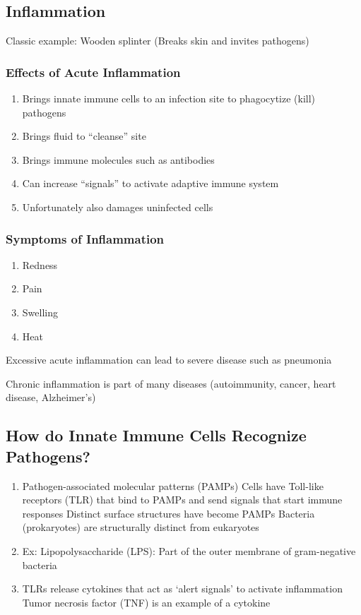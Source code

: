\documentclass{notes}
\begin{document}
\subsection{Inflammation}
Classic example: Wooden splinter (Breaks skin and invites pathogens)

\subsubsection*{Effects of Acute Inflammation}
\begin{enumerate}
    \item Brings innate immune cells to an infection site to phagocytize (kill) pathogens
    \item Brings fluid to ``cleanse'' site
    \item Brings immune molecules such as antibodies
    \item Can increase ``signals'' to activate adaptive immune system
    \item Unfortunately also damages uninfected cells
\end{enumerate}

\subsubsection*{Symptoms of Inflammation}
\begin{enumerate}
    \item Redness
    \item Pain
    \item Swelling
    \item Heat
\end{enumerate}

Excessive acute inflammation can lead to severe disease such as pneumonia

\hspace*{10px}Chronic inflammation is part of many diseases (autoimmunity, cancer, heart disease, Alzheimer's)

\subsection{How do Innate Immune Cells Recognize Pathogens?}
\begin{enumerate}
    \item Pathogen-associated molecular patterns (PAMPs)
          \subitem Cells have Toll-like receptors (TLR) that bind to PAMPs and send signals that start immune responses
          \subsubitem Distinct surface structures have become PAMPs
          \subsubitem Bacteria (prokaryotes) are structurally distinct from eukaryotes
    \item Ex: Lipopolysaccharide (LPS): Part of the outer membrane of gram-negative bacteria
    \item TLRs release cytokines that act as `alert signals' to activate inflammation
          \subitem Tumor necrosis factor (TNF) is an example of a cytokine
\end{enumerate}
\end{document}

